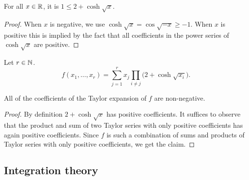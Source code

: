 \begin{lemma}
  \label{lem:le-coshsqrt} %
  \leanok
  For all $x \in \mathbb{R}$, it is $1 \le 2 + \cosh\sqrt{x}$.
\end{lemma}
%
\begin{proof}
  When $x$ is negative, we use $\cosh \sqrt{x} = \cos \sqrt{-x}\ge -1$. When $x$ is positive this is implied by the fact that all coefficients in the power series of $\cosh \sqrt{x}$ are positive.
\end{proof}

\begin{definition}
  \label{def:f}
  \leanok
  Let $r \in \mathbb{N}$.
  \begin{equation}\label{eq:f}
    f(x_1,\dots,x_r) = \sum_{j = 1}^r x_j \prod_{i \ne j} \big( 2 + \cosh\sqrt{x_i} \big).
  \end{equation}
\end{definition}

\begin{lemma}
  \label{lem:taylor-nonneg}
  All of the coefficients of the Taylor expansion of $f$ are non-negative.
\end{lemma}
%
\begin{proof}
  By definition $2+\cosh\sqrt{x}$ has positive coefficients. It suffices to observe that the product and sum of two Taylor series with only positive coefficients has again positive coefficients. Since $f$ is such a combination of sums and products of Taylor series with only positive coefficients, we get the claim.
\end{proof}


\subsection{Integration theory}


\begin{lemma}
  \label{lem:fubini-finite}
\end{lemma}

